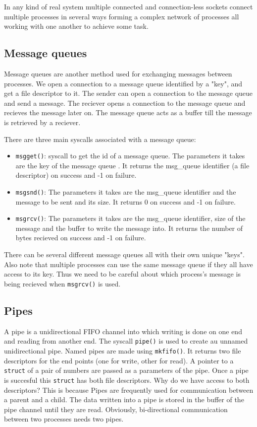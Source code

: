 \documentclass[12pt]{article}
\begin{document}
In any kind of real system multiple connected and connection-less sockets connect multiple processes in several ways forming a complex network of processes all working with one another to achieve some task. 

\subsection{Message queues}
Message queues are another method used for exchanging messages between processes. We open a connection to a message queue identified by a "key", and get a file descriptor to it. The sender can open a connection to
the message queue and send a message. The reciever opens a connection to the message queue and recieves the message later on. The message queue acts as a buffer till the message is retrieved by a reciever.


There are three main syscalls associated with a message queue:
\begin{itemize}[topsep=0pt, partopsep=0pt, itemsep=0pt, parsep=0pt]
    \item \texttt{msgget()}: syscall to get the id of a message queue. The parameters it takes are the key of the message queue . It returns the msg\_queue identifier (a file descriptor) on success and -1 on failure.
    \item \texttt{msgsnd()}: The parameters it takes are the msg\_queue identifier and the message to be sent and its size. It returns 0 on success and -1 on failure. 
    \item \texttt{msgrcv()}: The parameters it takes are the msg\_queue identifier, size of the message and the buffer to write the message into. It returns the number of bytes recieved on success and -1 on failure.
\end{itemize}
There can be several different message queues all with their own unique "keys". Also note that multiple processes can use the same message queue if they all have access to its key. Thus we need to be careful about which process's message is being recieved when \texttt{msgrcv()} is used.

\subsection{Pipes}
A pipe is a unidirectional FIFO channel into which writing is done on one end and reading from another end. The syscall \texttt{pipe()} is used to create au unnamed unidirectional pipe. Named pipes are made using \texttt{mkfifo()}. It returns two file descriptors for 
the end points (one for write, other for read). A pointer to a \texttt{struct} of a pair of numbers are passed as a parameters of the pipe. Once a pipe is succesful this \texttt{struct} has both file descriptors. Why do we have access to both descriptors? This is because Pipes
are frequently used for communication between a parent and a child. The data written into a pipe is stored in the buffer of the pipe channel until they are read. Obviously, bi-directional communication between two processes needs two pipes. 
\end{document}
